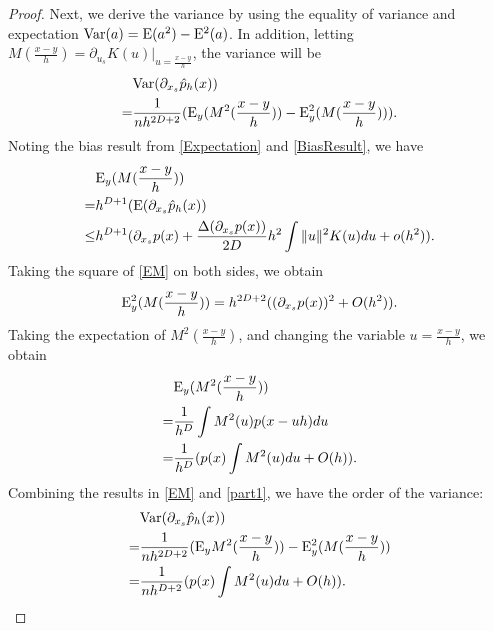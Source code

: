 \documentclass[aos,preprint]{imsart}
\theoremstyle{remark}
\begin{document}
\begin{appendix}
\begin{proof}
Next, we derive the variance by using the equality of variance and expectation ${\rm Var}(a) = {\rm E}(a^2)-{\rm E}^2(a)$.
In addition, letting $M(\frac{x-y}{h}) = \partial_ {u_s}  K(u)|_{u=\frac{x-y}{h}}$, the variance will be
\begin{equation}\label{e11}
\begin{aligned}
 &{\rm Var} (\partial_{x_s} \hat{p}_h(x))\\
  = &\frac{1}{nh^{2D+2}}({\rm E}_y (M^2(\frac{x-y}{h}))-{\rm E}^2_y(M(\frac{x-y}{h}))).
\end{aligned}
\end{equation}
Noting the bias result from \eqref{Expectation} and \eqref{BiasResult}, we have
\begin{equation}\label{EM}
\begin{aligned}
&{\rm E}_y(M(\frac{x-y}{h})) \\
= &h^{D+1} ( {\rm E}(\partial_{x_s} \hat{p}_h(x))\\
\leq &h^{D+1} (\partial_{x_s} p(x)+\frac{\Delta(\partial_{x_s}p(x))}{2D} h^2 \int \|u\|^2 K(u) du+o(h^2)).
\end{aligned}
\end{equation}
Taking the square of \eqref{EM} on both sides, we obtain
\[
{\rm E}^2_y(M(\frac{x-y}{h})) = h^{2D+2}((\partial_{x_s} p(x))^2+ O(h^2)).
\]
Taking the expectation of $M^2(\frac{x-y}{h})$, and changing the variable $u=\frac{x-y}{h}$, we obtain
\begin{equation}\label{part1}
\begin{aligned}
&{\rm E}_y(M^2(\frac{x-y}{h})) \\
=& \frac{1}{h^D} \int M^2(u) p(x-uh) du \\
= &\frac{1}{h^D}(p(x)\int M^2(u)du+O(h)).
\end{aligned}
\end{equation}
Combining the results in \eqref{EM} and \eqref{part1}, we have the order of the variance:
\begin{equation}\label{Var}
\begin{aligned}
  & {\rm Var} (\partial_{x_s} \hat{p}_h(x))  \\
=& \frac{1}{n h^{2D+2}}({\rm E}_yM^2(\frac{x-y}{h}))-{\rm E}^2_y(M(\frac{x-y}{h})) \\
=& \frac{1}{n h^{D+2}} (p(x)\int M^2(u)du +O(h)).
\end{aligned}
\end{equation}

\end{proof}
\end{appendix}
\end{document}
